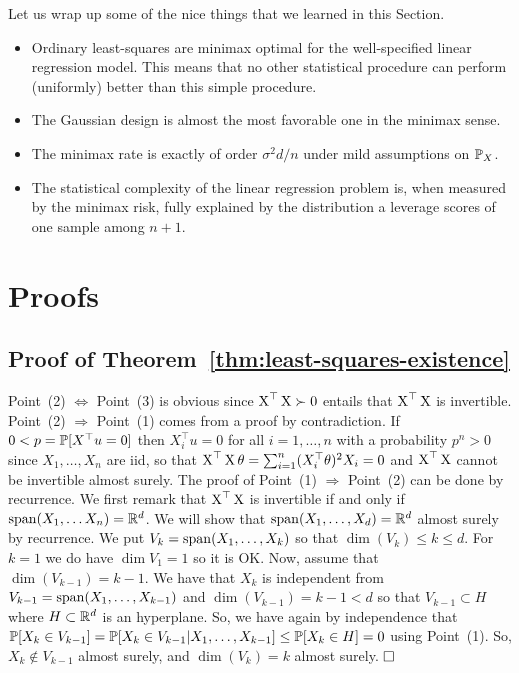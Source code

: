 Let us wrap up some of the nice things that we learned in this Section.
\begin{itemize}
	\item Ordinary least-squares are minimax optimal for the well-specified linear regression model. This means that no other statistical procedure can perform (uniformly) better than this simple procedure.
	\item The Gaussian design is almost the most favorable one in the minimax sense.
	\item The minimax rate is exactly of order $\sigma^2 d / n$ under mild assumptions
	 on $\P_X$.
	\item The statistical complexity of the linear regression problem is, when measured by the minimax risk, fully explained by the distribution a leverage scores of one sample among $n+1$.
\end{itemize}


\section{Proofs} %
\label{sec:chap04_proofs}

\subsection{Proof of Theorem~\ref{thm:least-squares-existence}} %

Point~(2) $\Leftrightarrow$ Point~(3) is obvious since $\bX^\top \bX \succ 0$ entails that $\bX^\top \bX$ is invertible. 
Point~(2) $\Rightarrow$ Point~(1) comes from a proof by contradiction. If $0 < p = \P[X^\top u = 0]$ then $X_i^\top u = 0$ for all $i=1, \ldots, n$ with a probability $p^n > 0$ since $X_1, \ldots, X_n$ are iid, so that $\bX^\top \bX \theta = \sum_{i=1}^n (X_i^\top \theta)^2 X_i = 0$ and $\bX^\top \bX$ cannot be invertible almost surely.
The proof of Point~(1) $\Rightarrow$ Point~(2) can be done by recurrence. 
We first remark that $\bX^\top \bX$ is invertible if and only if $\spa(X_1, \ldots X_n) = \R^d$.%
We will show that $\spa(X_1, \ldots, X_d) = \R^d$ almost surely by recurrence. 
We put $V_k = \spa(X_1, \ldots, X_k)$ so that $\dim(V_k) \leq k \leq d$.
For $k=1$ we do have $\dim V_1 = 1$ so it is OK.
Now, assume that $\dim(V_{k-1}) = k-1$. 
We have that $X_k$ is independent from $V_{k-1} = \spa(X_1, \ldots, X_{k-1})$ and $\dim(V_{k-1}) = k-1 < d$ so that $V_{k-1} \subset H$ where $H \subset \R^d$ is an hyperplane. 
So, we have again by independence that $\P[X_k \in V_{k-1}] = \P[X_k \in V_{k-1} | X_1, \ldots, X_{k-1}] \leq \P[X_k \in H] = 0$ using Point~(1). 
So, $X_k \notin V_{k-1}$ almost surely, and $\dim(V_k) = k$ almost surely. $\hfill \square$


